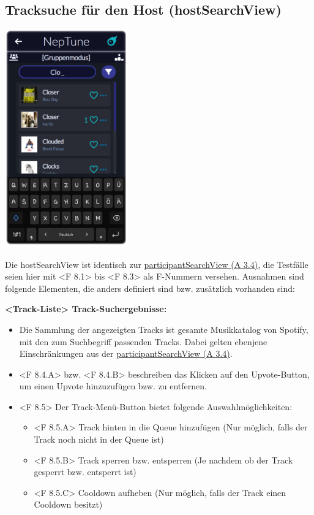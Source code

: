 \documentclass[oneside, ngerman]{sdqtechreport}
\begin{document}
\subsection{Tracksuche für den Host (hostSearchView)}
\label{sec:Benutzeroberfläche:hostSearchView}


\begin{center}
    \hypertarget{hostSearchView}{}
    \includegraphics[width=0.4\textwidth]{LATEX/Pflichtenheft/GraphicDesigns/hostSearchPage.png}
\end{center}

Die hostSearchView ist identisch zur \hyperlink{participantSearchView}{participantSearchView (A 3.4)}, die Testfälle seien hier mit <F 8.1> bis <F 8.3> als F-Nummern versehen. Ausnahmen sind folgende Elementen, die anders definiert sind bzw. zusätzlich vorhanden sind:

\textbf{<Track-Liste> Track-Suchergebnisse:}
\begin{itemize}
    \item Die Sammlung der angezeigten Tracks ist gesamte Musikkatalog von Spotify, mit den zum Suchbegriff passenden Tracks. Dabei gelten ebenjene Einschränkungen aus der \hyperlink{participantSearchView}{participantSearchView (A 3.4)}.
    \hypertarget{<F 8.4.A>}{}
    \hypertarget{<F 8.4.B>}{}
    \item <F 8.4.A> bzw. <F 8.4.B> beschreiben das Klicken auf den Upvote-Button, um einen Upvote hinzuzufügen bzw. zu entfernen.
    \hypertarget{<F 8.5>}{}
    \item <F 8.5> Der Track-Menü-Button bietet folgende Auswahlmöglichkeiten:
    \begin{itemize}
    \hypertarget{<F 8.5.A>}{}
        \item <F 8.5.A> Track hinten in die Queue hinzufügen (Nur möglich, falls der Track noch nicht in der Queue ist)
        \hypertarget{<F 8.5.B>}{}
        \item <F 8.5.B> Track sperren bzw. entsperren (Je nachdem ob der Track gesperrt bzw. entsperrt ist)
        \hypertarget{<F 8.5.C>}{}
        \item <F 8.5.C> Cooldown aufheben (Nur möglich, falls der Track einen Cooldown besitzt)
    \end{itemize}
\end{itemize}
\end{document}
